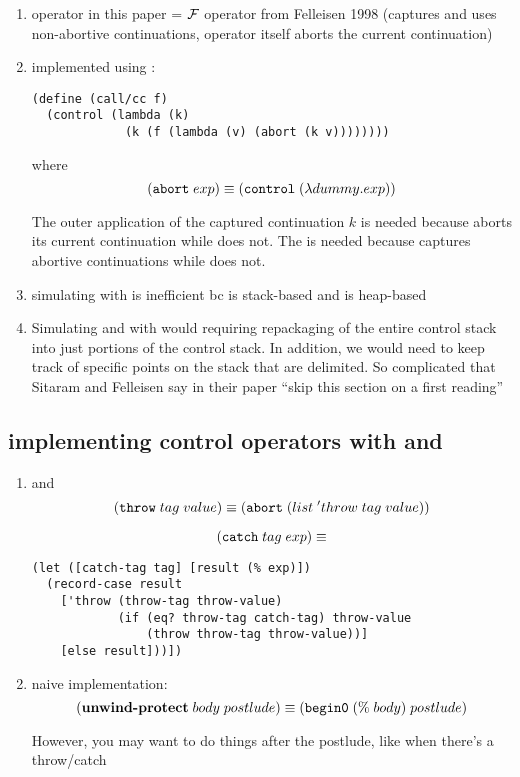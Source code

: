 \documentclass[letterpaper]{llncs}
\begin{document}
\begin{enumerate}
	\item \ctrl operator in this paper = $ \mathcal{F} $ operator from Felleisen 1998 (captures and uses non-abortive continuations, operator itself aborts the current continuation)
	\item \callcc implemented using \ctrl:
\begin{verbatim}
(define (call/cc f)
  (control (lambda (k)
             (k (f (lambda (v) (abort (k v))))))))
\end{verbatim}

where $$ (  \texttt{abort}  \;  exp  )  \equiv  (  \texttt{control}  \;   ( \lambda dummy.exp )   ) $$

The outer application of the captured continuation $k$ is needed because \ctrl aborts its current continuation while \callcc does not. The \abort is needed because \callcc captures abortive continuations while \ctrl does not.

	\item simulating \ctrl with \callcc is inefficient bc \ctrl is stack-based and \callcc is heap-based
	\item Simulating \ctrl and \run with \callcc would requiring repackaging of the entire control stack into just portions of the control stack. In addition, we would need to keep track of specific points on the stack that are delimited. So complicated that Sitaram and Felleisen say in their paper ``skip this section on a first reading''
\end{enumerate}

\subsection*{implementing control operators with \ctrl and \run}
\begin{enumerate}
	\item \catch and \throw
	$$ (  \texttt{throw}  \;    tag  \;  value    )  
	      \equiv
	   (  \texttt{abort}  \;   ( list \;   'throw \;   tag \; value     )   ) $$
	  
	$$ (  \texttt{catch}  \;   tag \; exp   ) 
	      \equiv$$	
	      
\begin{verbatim}
(let ([catch-tag tag] [result (% exp)])
  (record-case result
    ['throw (throw-tag throw-value)
            (if (eq? throw-tag catch-tag) throw-value
                (throw throw-tag throw-value))]
    [else result]))])
\end{verbatim}



	\item \unwindprotect
	
	naive implementation:
	$$ (  \textbf{unwind-protect}  \;   body \; postlude   )  
	      \equiv
	   (  \texttt{begin0}  \;     ( \% \; body )   \;  postlude    ) $$
	  
	However, you may want to do things after the postlude, like when there's a throw/catch
\end{enumerate}
\end{document}
